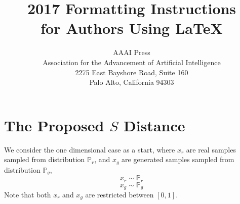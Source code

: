 \documentclass[letterpaper]{article} %
\begin{document}
%
\title{2017 Formatting Instructions \\for Authors Using \LaTeX{}}
\author{AAAI Press\\
Association for the Advancement of Artificial Intelligence\\
2275 East Bayshore Road, Suite 160\\
Palo Alto, California 94303\\
}
\maketitle
\begin{abstract}
\end{abstract}

\section{The Proposed $S$ Distance}
We consider the one dimensional case as a start, where $x_{r}$ are real samples sampled from distribution $\mathbb{P}_{r}$, and $x_{g}$ are generated samples sampled from distribution $\mathbb{P}_{g}$,
\begin{equation}\label{x-r}
   x_{r} \sim \mathbb{P}_{r}
\end{equation}
\begin{equation}\label{x-g}
  x_{g} \sim \mathbb{P}_{g}
\end{equation}
Note that both $x_{r}$ and $x_{g}$ are restricted between $[0,1]$.
\end{document}
